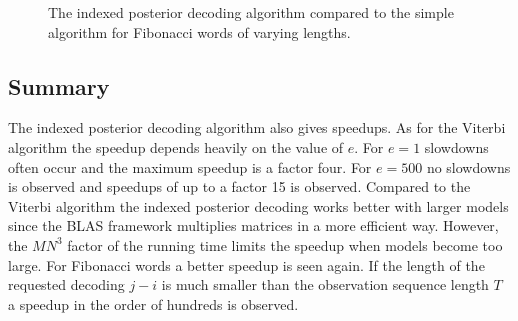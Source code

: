 \begin{figure}
  \centering
  
  \caption{The indexed posterior decoding algorithm compared to the simple
    algorithm for Fibonacci words of varying lengths.}
  \label{fig:indexed_posterior_fib_speedup_vs_T}
\end{figure}

\subsection{Summary}

The indexed posterior decoding algorithm also gives speedups. As for the
Viterbi algorithm the speedup depends heavily on the value of $e$. For $e = 1$
slowdowns often occur and the maximum speedup is a factor four. For $e = 500$
no slowdowns is observed and speedups of up to a factor 15 is observed.
Compared to the Viterbi algorithm the indexed posterior decoding works better
with larger models since the BLAS framework multiplies matrices in a more
efficient way. However, the $M N^3$ factor of the running time limits the speedup
when models become too large. For Fibonacci words a better speedup is seen
again. If the length of the requested decoding $j - i$ is much smaller than the
observation sequence length $T$ a speedup in the order of hundreds is observed.

